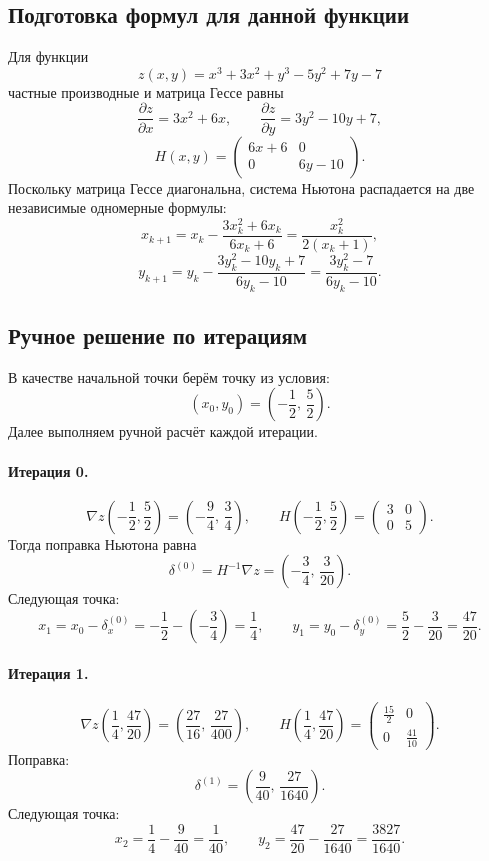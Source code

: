 \documentclass[12pt,a4paper]{article}
\begin{document}
\subsection{Подготовка формул для данной функции}
Для функции
\[
z(x,y)=x^3+3x^2+y^3-5y^2+7y-7
\]
частные производные и матрица Гессе равны
\[
\frac{\partial z}{\partial x}=3x^2+6x,\qquad
\frac{\partial z}{\partial y}=3y^2-10y+7,
\]
\[
H(x,y)=
\begin{pmatrix}
6x+6 & 0\\
0 & 6y-10
\end{pmatrix}.
\]
Поскольку матрица Гессе диагональна, система Ньютона распадается на две независимые одномерные формулы:
\[
x_{k+1}=x_k-\frac{3x_k^2+6x_k}{6x_k+6}
=\frac{x_k^2}{2(x_k+1)},
\]
\[
y_{k+1}=y_k-\frac{3y_k^2-10y_k+7}{6y_k-10}
=\frac{3y_k^2-7}{6y_k-10}.
\]

\subsection{Ручное решение по итерациям}
В качестве начальной точки берём точку из условия:
\[
(x_0,y_0)=\left(-\frac12,\,\frac52\right).
\]
Далее выполняем ручной расчёт каждой итерации.

\paragraph{Итерация 0.}
\[
\nabla z\left(-\frac12,\frac52\right)=\left(-\frac94,\,\frac34\right),
\qquad
H\left(-\frac12,\frac52\right)=
\begin{pmatrix}
3 & 0\\
0 & 5
\end{pmatrix}.
\]
Тогда поправка Ньютона равна
\[
\delta^{(0)}=H^{-1}\nabla z=
\left(-\frac34,\,\frac3{20}\right).
\]
Следующая точка:
\[
x_1=x_0-\delta_x^{(0)}=-\frac12-\left(-\frac34\right)=\frac14,
\qquad
y_1=y_0-\delta_y^{(0)}=\frac52-\frac3{20}=\frac{47}{20}.
\]

\paragraph{Итерация 1.}
\[
\nabla z\left(\frac14,\frac{47}{20}\right)=\left(\frac{27}{16},\,\frac{27}{400}\right),
\qquad
H\left(\frac14,\frac{47}{20}\right)=
\begin{pmatrix}
\frac{15}{2} & 0\\
0 & \frac{41}{10}
\end{pmatrix}.
\]
Поправка:
\[
\delta^{(1)}=
\left(\frac{9}{40},\,\frac{27}{1640}\right).
\]
Следующая точка:
\[
x_2=\frac14-\frac{9}{40}=\frac1{40},
\qquad
y_2=\frac{47}{20}-\frac{27}{1640}=\frac{3827}{1640}.
\]
\end{document}
